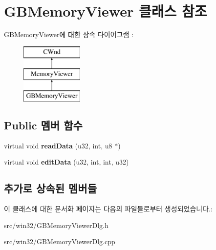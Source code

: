 \hypertarget{class_g_b_memory_viewer}{}\section{G\+B\+Memory\+Viewer 클래스 참조}
\label{class_g_b_memory_viewer}
G\+B\+Memory\+Viewer에 대한 상속 다이어그램 \+: \begin{figure}[H]
\begin{center}
\leavevmode
\includegraphics[height=3.000000cm]{class_g_b_memory_viewer}
\end{center}
\end{figure}
\subsection*{Public 멤버 함수}
\begin{DoxyCompactItemize}
\item 
\mbox{\label{class_g_b_memory_viewer_a9feb85c84ffef853cad4139ea8c3c567}} 
virtual void {\bfseries read\+Data} (u32, int, u8 $\ast$)
\item 
\mbox{\label{class_g_b_memory_viewer_ada4ac6d60aab7d4169b8809cf7fe7e1e}} 
virtual void {\bfseries edit\+Data} (u32, int, int, u32)
\end{DoxyCompactItemize}
\subsection*{추가로 상속된 멤버들}


이 클래스에 대한 문서화 페이지는 다음의 파일들로부터 생성되었습니다.\+:\begin{DoxyCompactItemize}
\item 
src/win32/G\+B\+Memory\+Viewer\+Dlg.\+h\item 
src/win32/G\+B\+Memory\+Viewer\+Dlg.\+cpp\end{DoxyCompactItemize}
